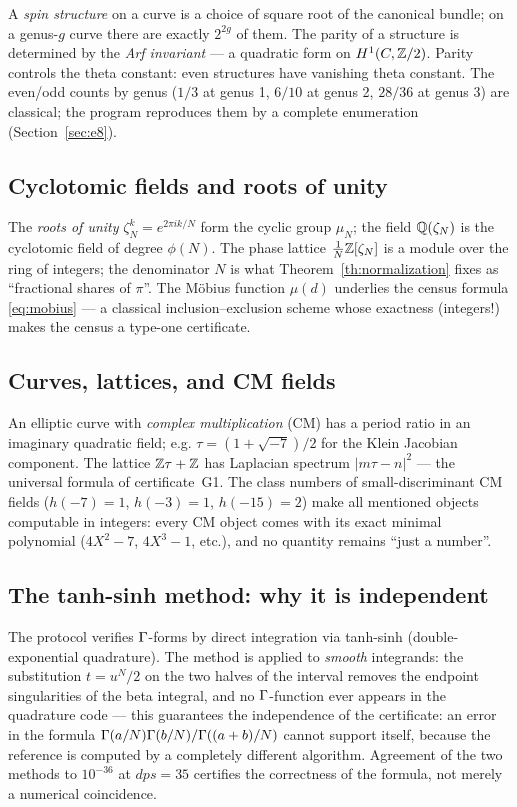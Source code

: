 A \emph{spin structure} on a curve is a choice of square root of the
canonical bundle; on a genus-$g$ curve there are exactly $2^{2g}$ of
them. The parity of a structure is determined by the \emph{Arf
invariant} --- a quadratic form on $H^1(C,\mathbb{Z}/2)$. Parity controls
the theta constant: even structures have vanishing theta constant.
The even/odd counts by genus ($1/3$ at genus 1, $6/10$ at genus 2,
$28/36$ at genus 3) are classical; the program reproduces them by a
complete enumeration (Section~\ref{sec:e8}).

\subsection{Cyclotomic fields and roots of unity}

The \emph{roots of unity} $\zeta_N^k=e^{2\pi ik/N}$ form the cyclic
group $\mu_N$; the field $\mathbb{Q}(\zeta_N)$ is the cyclotomic field of
degree $\phi(N)$. The phase lattice $\frac1N\mathbb{Z}[\zeta_N]$ is a
module over the ring of integers; the denominator $N$ is what
Theorem~\ref{th:normalization} fixes as ``fractional shares of
$\pi$''. The M\"obius function $\mu(d)$ underlies the census formula
\eqref{eq:mobius} --- a classical inclusion--exclusion scheme whose
exactness (integers!) makes the census a type-one certificate.

\subsection{Curves, lattices, and CM fields}

An elliptic curve with \emph{complex multiplication} (CM) has a
period ratio in an imaginary quadratic field; e.g.
$\tau=(1+\sqrt{-7})/2$ for the Klein Jacobian component. The lattice
$\mathbb{Z}\tau+\mathbb{Z}$ has Laplacian spectrum $|m\tau-n|^2$ --- the universal
formula of certificate~G1. The class numbers of small-discriminant
CM fields ($h(-7)=1$, $h(-3)=1$, $h(-15)=2$) make all mentioned
objects computable in integers: every CM object comes with its exact
minimal polynomial ($4X^2-7$, $4X^3-1$, etc.), and no quantity
remains ``just a number''.

\subsection{The tanh-sinh method: why it is independent}

The protocol verifies $\Gamma$-forms by direct integration via tanh-sinh
(double-exponential quadrature). The method is applied to
\emph{smooth} integrands: the substitution $t=u^N/2$ on the two
halves of the interval removes the endpoint singularities of the
beta integral, and no $\Gamma$-function ever appears in the quadrature
code --- this guarantees the independence of the certificate: an
error in the formula $\Gamma(a/N)\Gamma(b/N)/\Gamma((a+b)/N)$ cannot support
itself, because the reference is computed by a completely different
algorithm. Agreement of the two methods to $10^{-36}$ at $dps=35$
certifies the correctness of the formula, not merely a numerical
coincidence.

